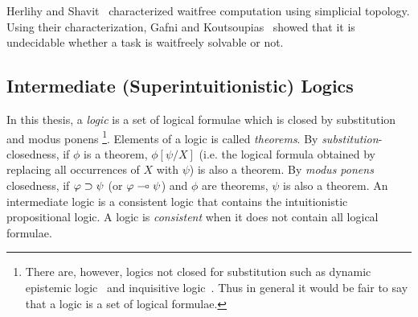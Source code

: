 Herlihy and Shavit~\cite{Herlihy99} characterized waitfree
computation using
simplicial topology.
Using their characterization,
Gafni and Koutsoupias~\cite{gafni1999three}
 showed that it is undecidable whether a task is waitfreely solvable
 or not.

\subsection{Intermediate (Superintuitionistic) Logics}

In this thesis,
a \textit{logic} is a set of logical formulae which is
closed by
substitution and modus ponens%
\footnote{There are, however, logics not closed for substitution such as
dynamic epistemic logic~\citep{ditmarsch2007dynamic} and
inquisitive logic~\citep{ciardelli2011}.  Thus
in general it would be fair to say that a logic is a set of logical
formulae.}.
Elements of a logic is called \textit{theorems}.
By \textit{substitution}-closedness, if $\phi$ is a
theorem, $\phi[\psi/X]$ (i.e. the
logical formula obtained by replacing all occurrences of $X$ with
$\psi$) is also a theorem.
By \textit{modus ponens} closedness, if
$\varphi\supset\psi$ (or $\varphi\multimap\psi$) and $\phi$ are
theorems, $\psi$ is also a theorem.
An intermediate logic is a consistent logic
that contains the intuitionistic propositional logic.  A logic is
\textit{consistent} when it does not
contain all logical formulae.

